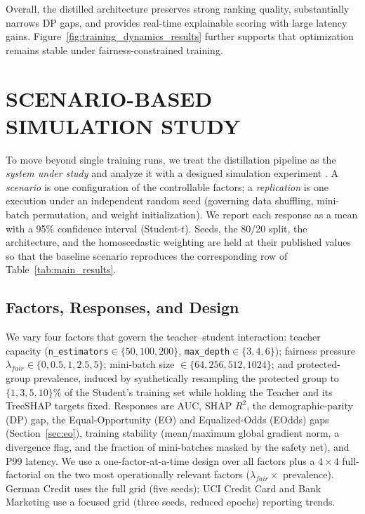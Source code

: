 \documentclass{wscpaperproc}
\theoremstyle{wsc}
\begin{document}
Overall, the distilled architecture preserves strong ranking quality, substantially narrows DP gaps, and provides real-time explainable scoring with large latency gains. Figure~\ref{fig:training_dynamics_results} further supports that optimization remains stable under fairness-constrained training.

\section{SCENARIO-BASED SIMULATION STUDY}
\label{sec:simulation}

To move beyond single training runs, we treat the distillation pipeline as the \emph{system under study} and analyze it with a designed simulation experiment \cite{bcnn:simulation}. A \emph{scenario} is one configuration of the controllable factors; a \emph{replication} is one execution under an independent random seed (governing data shuffling, mini-batch permutation, and weight initialization). We report each response as a mean with a 95\% confidence interval (Student-$t$). Seeds, the 80/20 split, the architecture, and the homoscedastic weighting are held at their published values so that the baseline scenario reproduces the corresponding row of Table~\ref{tab:main_results}.

\subsection{Factors, Responses, and Design}
We vary four factors that govern the teacher--student interaction: teacher capacity (\texttt{n\_estimators}$\in\{50,100,200\}$, \texttt{max\_depth}$\in\{3,4,6\}$); fairness pressure $\lambda_{fair}\in\{0,0.5,1,2.5,5\}$; mini-batch size $\in\{64,256,512,1024\}$; and protected-group prevalence, induced by synthetically resampling the protected group to $\{1,3,5,10\}\%$ of the Student's training set while holding the Teacher and its TreeSHAP targets fixed. Responses are AUC, SHAP $R^2$, the demographic-parity (DP) gap, the Equal-Opportunity (EO) and Equalized-Odds (EOdds) gaps (Section~\ref{sec:eo}), training stability (mean/maximum global gradient norm, a divergence flag, and the fraction of mini-batches masked by the safety net), and P99 latency. We use a one-factor-at-a-time design over all factors plus a $4\times4$ full-factorial on the two most operationally relevant factors ($\lambda_{fair}\times$ prevalence). German Credit uses the full grid (five seeds); UCI Credit Card and Bank Marketing use a focused grid (three seeds, reduced epochs) reporting trends.
\end{document}
